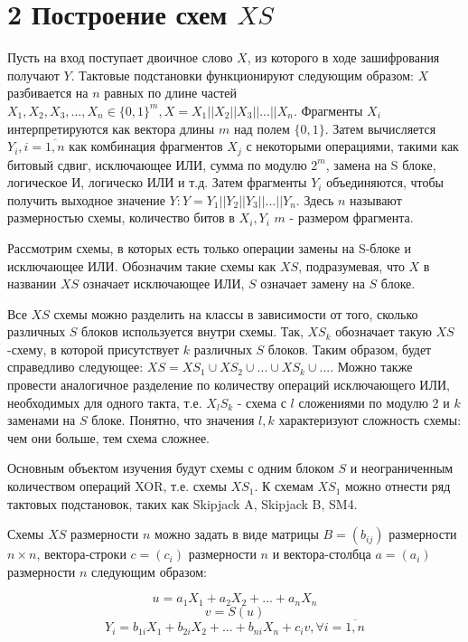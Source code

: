 \newpage
\section*{2 Построение схем $XS$}
\vspace*{1cm}


Пусть на вход поступает двоичное слово $X$, из которого в ходе зашифрования получают $Y$. Тактовые подстановки функционируют следующим образом: $X$ разбивается на $n$ равных по длине частей $X_1, X_2, X_3, ..., X_n \in \{0, 1\}^m, X = X_1||X_2||X_3||...||X_n$. Фрагменты $X_i$ интерпретируются как вектора длины $m$ над полем $\{0, 1\}$. Затем вычисляется $Y_i, i = \overline{1,n}$ как комбинация фрагментов $X_j$ с некоторыми операциями, такими как битовый сдвиг, исключающее ИЛИ, сумма по модулю $2^m$, замена на S блоке, логическое И, логическо ИЛИ и т.д. Затем фрагменты $Y_i$ объединяются, чтобы получить выходное значение $Y: Y = Y_1||Y_2||Y_3||...||Y_n$. Здесь $n$ называют размерностью схемы, количество битов в $X_i, Y_i$ $m$ - размером фрагмента.

Рассмотрим схемы, в которых есть только операции замены на S-блоке и исключающее ИЛИ. Обозначим такие схемы как $XS$, подразумевая, что $X$ в названии $XS$ означает исключающее ИЛИ, $S$ означает замену на $S$ блоке. 

Все $XS$ схемы можно разделить на классы в зависимости от того, сколько различных $S$ блоков используется внутри схемы. Так, $XS_k$ обозначает такую $XS$-схему, в которой присутствует $k$ различных $S$ блоков. Таким образом, будет справедливо следующее: $XS = XS_1 \cup XS_2 \cup ... \cup XS_k \cup...$. Можно также провести аналогичное разделение по количеству операций исключающего ИЛИ, необходимых для одного такта, т.е. $X_lS_k$ - схема с $l$ сложениями по модулю 2 и $k$ заменами на $S$ блоке. Понятно, что значения $l, k$ характеризуют сложность схемы: чем они больше, тем схема сложнее.

Основным объектом изучения будут схемы с одним блоком $S$ и неограниченным количеством операций XOR, т.е. схемы $XS_1$. К схемам $XS_1$ можно отнести ряд тактовых подстановок, таких как Skipjack A, Skipjack B, SM4. 

Схемы $XS$ размерности $n$ можно задать в виде матрицы $B = (b_{ij})$ размерности $n \times n$, вектора-строки $c = (c_i)$ размерности $n$ и вектора-столбца $a=(a_i)$ размерности $n$ следующим образом:

$$u = a_1X_1 + a_2X_2 + ... + a_nX_n$$
$$v = S(u)$$
$$Y_i = b_{1i}X_1 + b_{2i}X_2 + ... + b_{ni}X_n + c_iv, \forall i = \overline{1,n}$$

